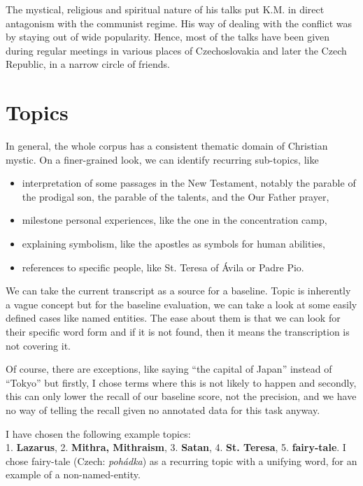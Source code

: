 \documentclass[12pt,a4paper]{report}
\begin{document}
The mystical, religious and spiritual nature of his talks put K.M. in
direct antagonism with the communist regime.  His way of dealing
with the conflict was by staying out of wide popularity. Hence, most of the
talks have been given during regular meetings in various places of
Czechoslovakia and later the Czech Republic, in a narrow circle of friends.

\section{Topics}

In general, the whole corpus has a consistent thematic domain of Christian mystic. On a
finer-grained look, we can identify recurring sub-topics, like

\begin{itemize}
\item{interpretation of some passages in the New Testament, notably the parable
of the prodigal son, the parable of the talents, and the Our Father prayer,}
\item{milestone personal experiences, like the one in the concentration camp,}
\item{explaining symbolism, like the apostles as symbols for human abilities,}
\item{references to specific people, like St. Teresa of \'{A}vila or Padre Pio.}
\end{itemize}

We can take the current transcript %
as a source for a baseline.
Topic is inherently a vague concept %
but for the baseline evaluation, we can take a look at some easily defined cases
like named entities. The ease about them is that we can look for their specific
word form and if it is not found, then it means the transcription is not
covering it.

Of course, there are exceptions, like saying ``the capital of Japan'' instead of
``Tokyo'' but firstly, I chose terms where this is not likely to happen and
secondly, this can only lower the recall of our baseline score, not the
precision, and we have no way of telling the recall given no annotated data
for this task anyway.

I have chosen the following example topics:\\
1. \textbf{Lazarus},
2. \textbf{Mithra, Mithraism},
3. \textbf{Satan},
4. \textbf{St. Teresa},
5. \textbf{fairy-tale}.
I chose fairy-tale (Czech: \emph{poh\'{a}dka}) as a recurring topic with a
unifying word, for an example of a non-named-entity.
\end{document}
